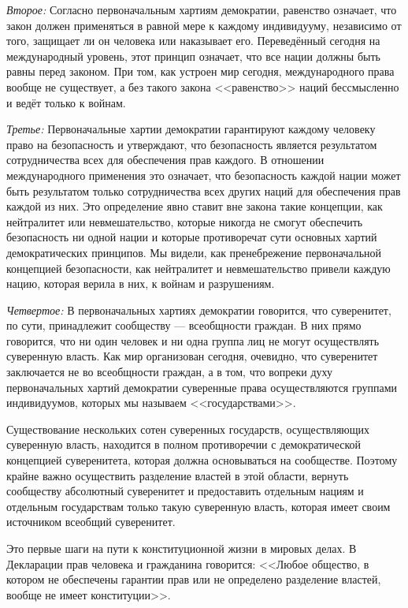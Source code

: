 \textit{Второе:} Согласно первоначальным хартиям демократии, равенство означает, что закон должен применяться в равной мере к каждому индивидууму, независимо от того, защищает ли он человека или наказывает его. Переведённый сегодня на международный уровень, этот принцип означает, что все нации должны быть равны перед законом. При том, как устроен мир сегодня, международного права вообще не существует, а без такого закона <<равенство>> наций бессмысленно и ведёт только к войнам.
 
\textit{Третье:} Первоначальные хартии демократии гарантируют каждому человеку право на безопасность и утверждают, что безопасность является результатом сотрудничества всех для обеспечения прав каждого. В отношении международного применения это означает, что безопасность каждой нации может быть результатом только сотрудничества всех других наций для обеспечения прав каждой из них. Это определение явно ставит вне закона такие концепции, как нейтралитет или невмешательство, которые никогда не смогут обеспечить безопасность ни одной нации и которые противоречат сути основных хартий демократических принципов. Мы видели, как пренебрежение первоначальной концепцией безопасности, как нейтралитет и невмешательство привели каждую нацию, которая верила в них, к войнам и разрушениям.

\textit{Четвертое:} В первоначальных хартиях демократии говорится, что суверенитет, по сути, принадлежит сообществу — всеобщности граждан. В них прямо говорится, что ни один человек и ни одна группа лиц не могут осуществлять суверенную власть. Как мир организован сегодня, очевидно, что суверенитет заключается не во всеобщности граждан, а в том, что вопреки духу первоначальных хартий демократии суверенные права осуществляются группами индивидуумов, которых мы называем <<государствами>>.
 
Существование нескольких сотен суверенных государств, осуществляющих суверенную власть, находится в полном противоречии с демократической концепцией суверенитета, которая должна основываться на сообществе. Поэтому крайне важно осуществить разделение властей в этой области, вернуть сообществу абсолютный суверенитет и предоставить отдельным нациям и отдельным государствам только такую суверенную власть, которая имеет своим источником всеобщий суверенитет.

Это первые шаги на пути к конституционной жизни в мировых делах. В Декларации прав человека и гражданина говорится: <<Любое общество, в котором не обеспечены гарантии прав или не определено разделение властей, вообще не имеет конституции>>.
 
